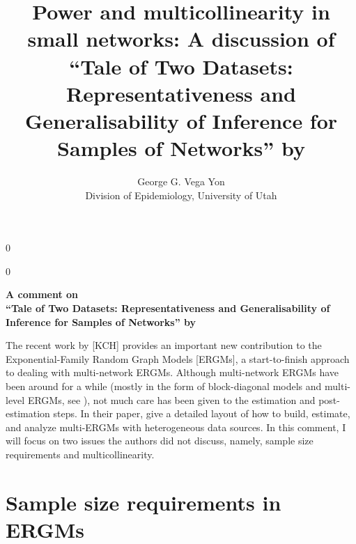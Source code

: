 \documentclass[12pt]{article}
\newcommand{\blind}{0}
\begin{document}
%

\def\spacingset#1{\renewcommand{\baselinestretch}%
{#1}\small\normalsize} \spacingset{1}



\def\blind{0}

\blind
{
  \title{\bf Power and multicollinearity in small networks: A discussion of\\``Tale of Two Datasets: Representativeness
  and Generalisability of Inference for Samples of Networks'' by \citeauthor*{krivitskyTaleTwoDatasets2022}}
  \author{George G. Vega Yon\hspace{.2cm}\\%
    Division of Epidemiology, University of Utah
    }
  \maketitle
} \fi

\blind
{ 
  \bigskip
  \bigskip
  \bigskip
  \begin{center}
    {\LARGE\bf A comment on\\``Tale of Two Datasets: Representativeness
    and Generalisability of Inference for Samples of Networks'' by \citeauthor*{krivitskyTaleTwoDatasets2022}}
\end{center}
  \medskip
} \fi

\spacingset{1.9} %

The recent work by \citeauthor*{krivitskyTaleTwoDatasets2022} [KCH] provides an important new contribution to the Exponential-Family Random Graph Models [ERGMs], a start-to-finish approach to dealing with multi-network ERGMs. Although multi-network ERGMs have been around for a while (mostly in the form of block-diagonal models and multi-level ERGMs, see \cite{duxburyScalingBiasPooled2023,wangExponentialRandomGraph2013, slaughterMultilevelModelsSocial2016}), not much care has been given to the estimation and post-estimation steps. In their paper, \citeauthor*{krivitskyTaleTwoDatasets2022} give a detailed layout of how to build, estimate, and analyze multi-ERGMs with heterogeneous data sources. In this comment, I will focus on two issues the authors did not discuss, namely, sample size requirements and multicollinearity. 


\section{Sample size requirements in ERGMs}
\end{document}
